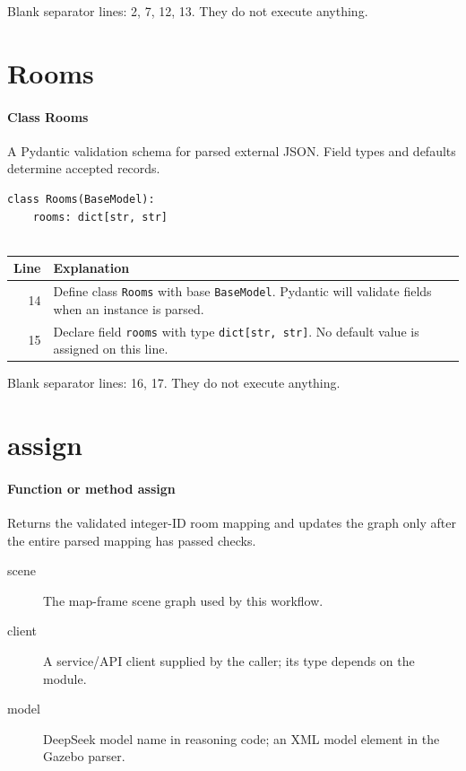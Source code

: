 \documentclass[11pt,a4paper]{book}
\begin{document}
Blank separator lines: 2, 7, 12, 13. They do not execute anything.

\section{Rooms}

\paragraph{Class Rooms}
A Pydantic validation schema for parsed external JSON. Field types and defaults determine accepted records.


\begin{lstlisting}[firstnumber=14]
class Rooms(BaseModel):
    rooms: dict[str, str]


\end{lstlisting}

\begin{longtable}{r p{}}

\textbf{Line} & \textbf{Explanation} \\ \hline \endhead

14 & Define class \texttt{Rooms} with base \texttt{BaseModel}. Pydantic will validate fields when an instance is parsed. \\

15 & Declare field \texttt{rooms} with type \texttt{dict[str, str]}. No default value is assigned on this line. \\

\end{longtable}

Blank separator lines: 16, 17. They do not execute anything.

\section{assign}

\paragraph{Function or method assign}
Returns the validated integer-ID room mapping and updates the graph only after the entire parsed mapping has passed checks.

\begin{description}
\item[scene] The map-frame scene graph used by this workflow.
\item[client] A service/API client supplied by the caller; its type depends on the module.
\item[model] DeepSeek model name in reasoning code; an XML model element in the Gazebo parser.
\end{description}
\end{document}
